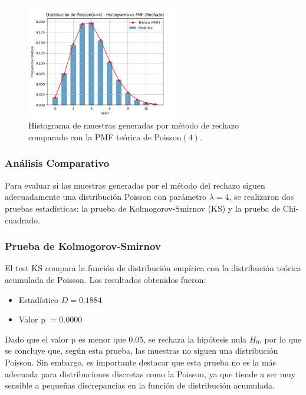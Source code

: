 \documentclass{article}
\begin{document}
\begin{figure}[H]
    \centering
    \includegraphics[width=0.6\textwidth]{visualizaciones/poisson_rechazo.png}
    \caption{Histograma de muestras generadas por método de rechazo comparado con la PMF teórica de Poisson$(4)$.}
    \label{fig:poisson_rechazo}
\end{figure}

\subsubsection{Análisis Comparativo}

Para evaluar si las muestras generadas por el método del rechazo siguen adecuadamente una distribución Poisson con parámetro \(\lambda = 4\), se realizaron dos pruebas estadísticas: la prueba de Kolmogorov-Smirnov (KS) y la prueba de Chi-cuadrado.

\subsubsection{Prueba de Kolmogorov-Smirnov}

El test KS compara la función de distribución empírica con la distribución teórica acumulada de Poisson. Los resultados obtenidos fueron:

\begin{itemize}
    \item Estadístico \(D = 0.1884\)
    \item Valor p \(= 0.0000\)
\end{itemize}

Dado que el valor p es menor que 0.05, se rechaza la hipótesis nula \(H_0\), por lo que se concluye que, según esta prueba, las muestras no siguen una distribución Poisson. Sin embargo, es importante destacar que esta prueba no es la más adecuada para distribuciones discretas como la Poisson, ya que tiende a ser muy sensible a pequeñas discrepancias en la función de distribución acumulada.
\end{document}
